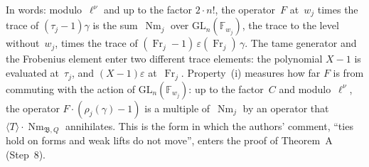 \documentclass[11pt,a4paper]{article}
\newcommand{\m}[1]{\mbox{$#1$}}        %
\theoremstyle{plainx}
\theoremstyle{uprightx}
\newcommand{\Fw}[1]{\mathbb{F}_{#1}}
\newcommand{\GL}{\mathrm{GL}}
\newcommand{\Nm}{\operatorname{Nm}}
\newcommand{\dg}[1]{\langle #1\rangle}
\newcommand{\fB}{\mathfrak{B}}
\newcommand{\Fr}{\operatorname{Fr}}
\newcommand{\NQ}{\Nm_{\fB,Q}}
\begin{document}
In words: modulo~$\ell^\nu$ and up to the factor \m{2\cdot n!}, the operator~$F$ at~$w_j$ times the trace of
\m{(\tau_j-1)\gamma} is the sum~\m{\Nm_j} over \m{\GL_n(\Fw{w_j})}, the trace to the level without~$w_j$, times the
trace of \m{(\Fr_j-1)\,\varepsilon(\Fr_j)\,\gamma}. The tame generator and the Frobenius element enter two different
trace elements: the polynomial \m{X-1} is evaluated at~$\tau_j$, and \m{(X-1)\varepsilon} at~$\Fr_j$. Property~(i)
measures how far $F$ is from commuting with the action of \m{\GL_n(\Fw{w_j})}: up to the factor~$C$ and
modulo~$\ell^\nu$, the operator \m{F\cdot(\rho_j(\gamma)-1)} is a multiple of~\m{\Nm_j} by an operator that
\m{\dg{T}\cdot\NQ} annihilates. This is the form in which the authors' comment, ``ties hold on forms and weak lifts
do not move'', enters the proof of Theorem~A (Step~8).
\end{document}
